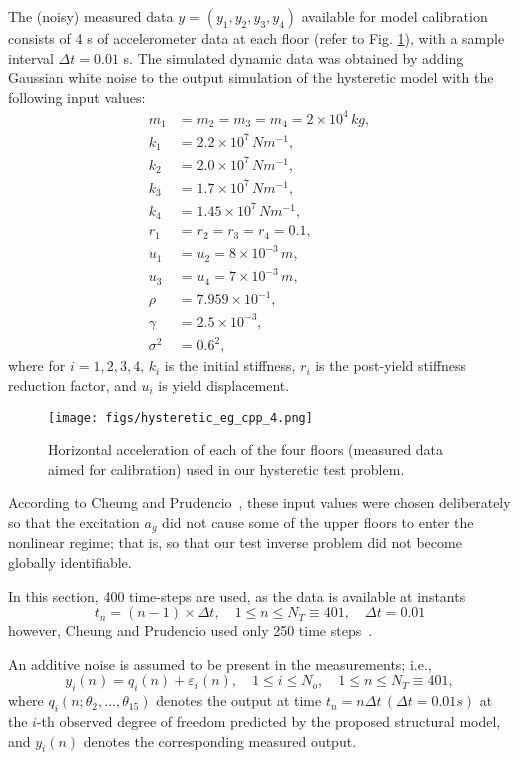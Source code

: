 The (noisy) measured data $y = (y_1, y_2, y_3, y_4)$ available for model calibration consists of 4 s of accelerometer data at each floor (refer to Fig. \ref{hig:hist_acceleration_4_floors}), with a sample interval $\Delta t = 0.01$ s. The simulated dynamic data was obtained by adding Gaussian white noise to the output simulation of the hysteretic model with the following input values:
\begin{align*}
m_1 & = m_2 = m_3 = m_4 = 2\times 10^4 \,kg,\\
k_1 &=  2.2 \times 10^7 \,Nm^{-1},\\
k_2 &=  2.0 \times 10^7 \,Nm^{-1},\\
k_3 &=  1.7 \times 10^7 \,Nm^{-1},\\
k_4 &=  1.45 \times 10^7 \,Nm^{-1},\\
r_1 & = r_2 = r_3 = r_4 = 0.1,\\
u_1 & = u_2 = 8 \times 10^{-3} \,m, \\
u_3 & = u_4 = 7 \times 10^{-3} \,m, \\
\rho &= 7.959 \times 10^{-1}, \\
\gamma &= 2.5 \times 10^{-3},\\
\sigma^2 &= 0.6^2,
\end{align*}
where for $i=1,2,3,4$, $k_i$ is the initial stiffness, $r_i$ is the post-yield stiffness reduction factor, and $u_i$ is  yield displacement.


\begin{figure}[hptb]
\centering
\texttt{[image: figs/hysteretic\_eg\_cpp\_4.png]}
\vspace{-8pt}
\caption{Horizontal acceleration of each of the four floors (measured data aimed for calibration) used in our hysteretic test problem.}
\label{hig:hist_acceleration_4_floors}
\end{figure}

According to Cheung and Prudencio~\cite{CheungPrudencio2012}, these input values were chosen deliberately so that the excitation $a_g$ did not cause some of the upper floors to enter the nonlinear regime; that is, so that our test inverse problem did not become globally identifiable. 

In this section, 400 time-steps are used, as the data is  available  at instants  
$$t_n = (n - 1) \times \Delta t, \quad 1 \leq n \leq N_T \equiv 401, \quad \Delta t = 0.01$$
however, Cheung and Prudencio used only 250 time steps~\cite{CheungPrudencio2012}. 

An additive noise is assumed to be present in the measurements; i.e.,
\begin{equation*}
y_i(n)=q_i(n)+\varepsilon_i(n), \quad 1 \leq i \leq N_o, \quad  1 \leq n \leq N_T \equiv 401, 
\end{equation*}
where $q_i(n; \theta_2 ,...,\theta_{15})$ denotes the output at time $t_n= n\Delta t \, (\Delta t=0.01s)$ at the $i$-th observed degree of freedom predicted by the proposed structural model, and $y_i(n)$ denotes the corresponding
measured output.


